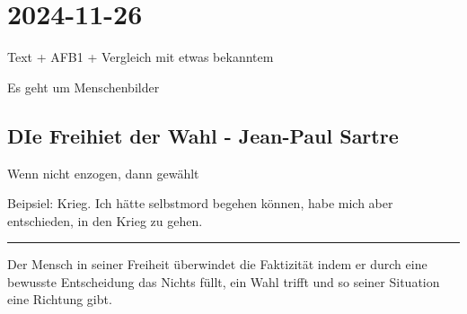 \section{2024-11-26}

Text + AFB1 + Vergleich mit etwas bekanntem

Es geht um Menschenbilder

\subsection{DIe Freihiet der Wahl - Jean-Paul Sartre}

\startitemize[packed]
\item Wenn nicht enzogen, dann gewählt
\startitemize[packed]
\item Beipsiel: Krieg. Ich hätte selbstmord begehen können, habe mich aber entschieden, in den Krieg zu gehen.
\stopitemize
\stopitemize



\blank
\hrule
\blank


Der Mensch in seiner Freiheit überwindet die Faktizität indem er durch eine
bewusste Entscheidung das Nichts füllt, ein Wahl trifft und so seiner
Situation eine Richtung gibt.
